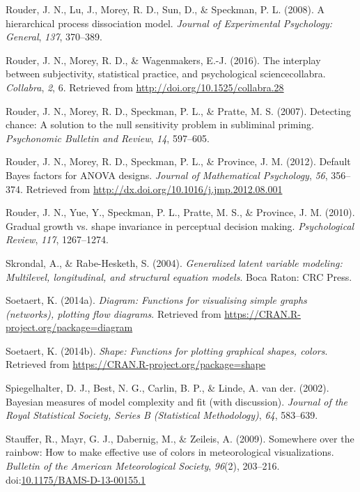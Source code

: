 \documentclass[english,man]{apa6}
\theoremstyle{definition}
\theoremstyle{definition}
\theoremstyle{remark}
\begin{document}
\hypertarget{ref-Rouder:etal:2008a}{}
Rouder, J. N., Lu, J., Morey, R. D., Sun, D., \& Speckman, P. L. (2008).
A hierarchical process dissociation model. \emph{Journal of Experimental
Psychology: General}, \emph{137}, 370--389.

\hypertarget{ref-Rouder:etal:2016b}{}
Rouder, J. N., Morey, R. D., \& Wagenmakers, E.-J. (2016). The interplay
between subjectivity, statistical practice, and psychological
sciencecollabra. \emph{Collabra}, \emph{2}, 6. Retrieved from
\url{http://doi.org/10.1525/collabra.28}

\hypertarget{ref-Rouder:etal:2007b}{}
Rouder, J. N., Morey, R. D., Speckman, P. L., \& Pratte, M. S. (2007).
Detecting chance: A solution to the null sensitivity problem in
subliminal priming. \emph{Psychonomic Bulletin and Review}, \emph{14},
597--605.

\hypertarget{ref-Rouder:etal:2012}{}
Rouder, J. N., Morey, R. D., Speckman, P. L., \& Province, J. M. (2012).
Default Bayes factors for ANOVA designs. \emph{Journal of Mathematical
Psychology}, \emph{56}, 356--374. Retrieved from
\url{http://dx.doi.org/10.1016/j.jmp.2012.08.001}

\hypertarget{ref-Rouder:etal:2010d}{}
Rouder, J. N., Yue, Y., Speckman, P. L., Pratte, M. S., \& Province, J.
M. (2010). Gradual growth vs. shape invariance in perceptual decision
making. \emph{Psychological Review}, \emph{117}, 1267--1274.

\hypertarget{ref-Skrondal:Rabe-Hesketh:2004}{}
Skrondal, A., \& Rabe-Hesketh, S. (2004). \emph{Generalized latent
variable modeling: Multilevel, longitudinal, and structural equation
models}. Boca Raton: CRC Press.

\hypertarget{ref-R-diagram}{}
Soetaert, K. (2014a). \emph{Diagram: Functions for visualising simple
graphs (networks), plotting flow diagrams}. Retrieved from
\url{https://CRAN.R-project.org/package=diagram}

\hypertarget{ref-R-shape}{}
Soetaert, K. (2014b). \emph{Shape: Functions for plotting graphical
shapes, colors}. Retrieved from
\url{https://CRAN.R-project.org/package=shape}

\hypertarget{ref-Spiegelhalter:etal:2002}{}
Spiegelhalter, D. J., Best, N. G., Carlin, B. P., \& Linde, A. van der.
(2002). Bayesian measures of model complexity and fit (with discussion).
\emph{Journal of the Royal Statistical Society, Series B (Statistical
Methodology)}, \emph{64}, 583--639.

\hypertarget{ref-R-colorspace_b}{}
Stauffer, R., Mayr, G. J., Dabernig, M., \& Zeileis, A. (2009).
Somewhere over the rainbow: How to make effective use of colors in
meteorological visualizations. \emph{Bulletin of the American
Meteorological Society}, \emph{96}(2), 203--216.
doi:\href{https://doi.org/10.1175/BAMS-D-13-00155.1}{10.1175/BAMS-D-13-00155.1}
\end{document}
